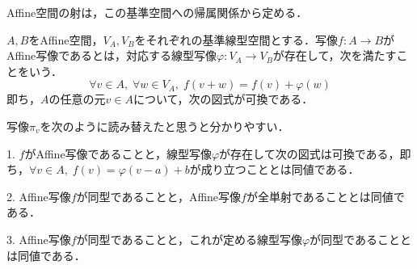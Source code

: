 \documentclass[uplatex,dvipdfmx]{jsreport}
\begin{document}
Affine空間の射は，この基準空間への帰属関係から定める．
\begin{definition}[Affine空間の射]
    $A,B$をAffine空間，$V_A,V_B$をそれぞれの基準線型空間とする．写像$f:A\to B$がAffine写像であるとは，対応する線型写像$\varphi:V_A\to V_B$が存在して，次を満たすことをいう．
    \[ \forall v\in A,\; \forall w\in V_A,\; f(v+w)=f(v)+\varphi(w) \]
    即ち，$A$の任意の元$v\in A$について，次の図式が可換である．
    \begin{center}
    \end{center}
\end{definition}
\begin{remark}
    写像$\pi_v$を次のように読み替えたと思うと分かりやすい．
    \begin{center}
    \end{center}
\end{remark}

\begin{lemma}
    1. $f$がAffine写像であることと，線型写像$\varphi$が存在して次の図式は可換である，即ち，$\forall v\in A,\; f(v)=\varphi(v-a)+b$が成り立つこととは同値である．
    \begin{center}
    \end{center}

    2. Affine写像$f$が同型であることと，Affine写像$f$が全単射であることとは同値である．

    3. Affine写像$f$が同型であることと，これが定める線型写像$\varphi$が同型であることとは同値である．
\end{lemma}
\end{document}
